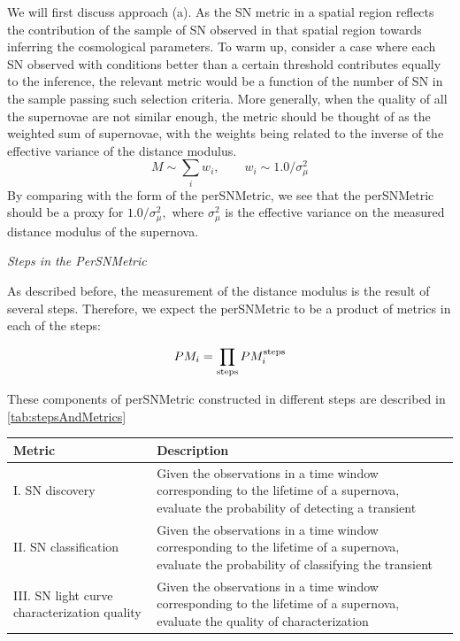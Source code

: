 We will first discuss approach (a). As the SN metric in a spatial region
reflects the contribution of the sample of SN observed in that spatial
region towards inferring the cosmological parameters. To warm up,
consider a case where each SN observed with conditions better than a
certain threshold contributes equally to the inference, the relevant
metric would be a function of the number of SN in the sample passing
such selection criteria. More generally, when the quality of all the
supernovae are not similar enough, the metric should be thought of as
the weighted sum of supernovae, with the weights being related to the
inverse of the effective variance of the distance modulus.
\begin{equation}
M\sim \sum_i w_i , \qquad  w_i \sim 1.0 /\sigma^2_\mu
\end{equation}
By comparing with the form of the perSNMetric, we see that the
perSNMetric should be a proxy for $1.0/\sigma^2_\mu,$ where
$\sigma^2_\mu$ is the effective variance on the measured distance
modulus of the supernova.

{\it  Steps in the PerSNMetric}

As described before, the measurement of the distance modulus is the
result of several steps. Therefore, we expect the perSNMetric to be a
product of metrics in each of the steps:

\begin{equation}
PM_i = \prod_{\rm{steps}} PM_i^{\rm{steps}}
\end{equation}

These components of perSNMetric constructed in different steps are
described in \autoref{tab:stepsAndMetrics}
\begin{center}
 \begin{table}
\begin{tabular}{| p{5cm} |p{10cm}| }
\hline Metric & Description \\
\hline
I. SN discovery  &  Given the observations in a time window corresponding to the lifetime of a supernova, evaluate the  probability of detecting a
transient \\
II. SN classification & Given the observations in a time window corresponding to the lifetime of a supernova, evaluate the probability of classifying the transient\\
III. SN light curve characterization quality & Given the observations in a time window corresponding to the lifetime of a supernova, evaluate the quality of characterization\\
\hline \end{tabular}
\label{tab:stepsAndMetrics}
\end{table}
\end{center}



